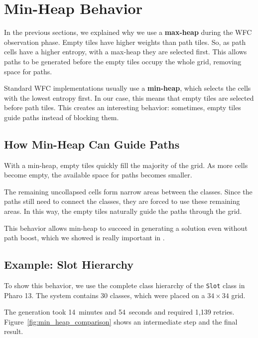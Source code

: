 \documentclass[../../main.tex]{subfiles}
\begin{document}
\section{Min-Heap Behavior}

\label{sec:min_heap_dynamics}

In the previous sections, we explained why we use a \textbf{max-heap} during the WFC observation phase. Empty tiles have higher weights than path tiles. So, as path cells have a higher entropy, with a max-heap they are selected first. This allows paths to be generated before the empty tiles occupy the whole grid, removing space for paths.

Standard WFC implementations usually use a \textbf{min-heap}, which selects the cells with the lowest entropy first. In our case, this means that empty tiles are selected before path tiles. This creates an interesting behavior: sometimes, empty tiles guide paths instead of blocking them.

\subsection{How Min-Heap Can Guide Paths}

With a min-heap, empty tiles quickly fill the majority of the grid. As more cells become empty, the available space for paths becomes smaller.

The remaining uncollapsed cells form narrow areas between the classes. Since the paths still need to connect the classes, they are forced to use these remaining areas. In this way, the empty tiles naturally guide the paths through the grid.

This behavior allows min-heap to succeed in generating a solution even without path boost, which we showed is really important in .

\subsection{Example: Slot Hierarchy}

To show this behavior, we use the complete class hierarchy of the \texttt{Slot} class in Pharo 13. The system contains 30 classes, which were placed on a $34 \times 34$ grid. 

The generation took 14~minutes and 54~seconds and required 1,139 retries. Figure~\ref{fig:min_heap_comparison} shows an intermediate step and the final result.
\end{document}
